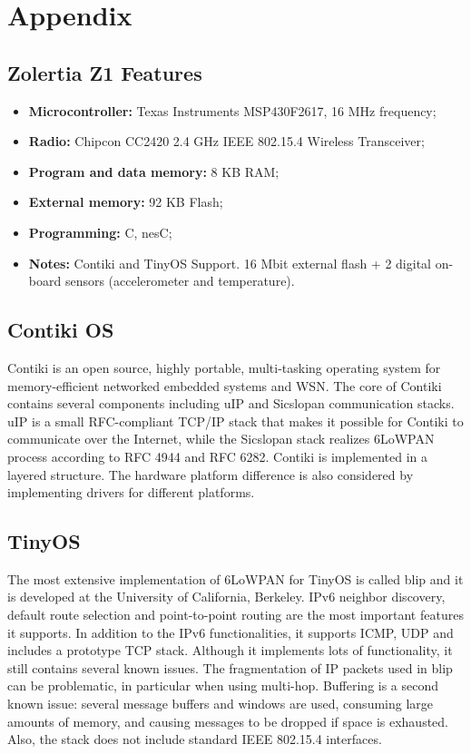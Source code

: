 \documentclass[10pt]{article}
\begin{document}
\section{Appendix}

\subsection{Zolertia Z1 Features}
\label{sec:z1-feats}
\begin{itemize}
  \item \textbf{Microcontroller:} Texas Instruments MSP430F2617, 16 MHz frequency;
  \item \textbf{Radio:} Chipcon CC2420 2.4 GHz IEEE 802.15.4 Wireless Transceiver;
  \item \textbf{Program and data memory:} 8 KB RAM;
  \item \textbf{External memory:} 92 KB Flash;
  \item \textbf{Programming:} C, nesC;
  \item \textbf{Notes:} Contiki and TinyOS Support. 16 Mbit external flash + 2 digital on-board sensors (accelerometer and temperature).
\end{itemize}

\subsection{Contiki OS}
Contiki is an open source, highly portable, multi-tasking operating system for memory-efficient networked embedded systems and WSN.  The core of Contiki contains several components including uIP and Sicslopan communication stacks. uIP is a small RFC-compliant TCP/IP stack that makes it possible for Contiki to communicate over the Internet, while the Sicslopan stack realizes 6LoWPAN process according to RFC 4944 and RFC 6282.  Contiki is implemented in a layered structure.  The hardware platform difference is also considered by implementing drivers for different platforms.  

\subsection{TinyOS}
The most extensive implementation of 6LoWPAN for TinyOS is called blip and it is developed at the University of California, Berkeley.  IPv6 neighbor discovery, default route selection and point-to-point routing are the most important features it supports. In addition to the IPv6 functionalities, it supports ICMP, UDP and includes a prototype TCP stack.  Although it implements lots of functionality, it still contains several known issues.  The fragmentation of IP packets used in blip can be problematic, in particular when using multi-hop.  Buffering is a second known issue: several message buffers and windows are used, consuming large amounts of memory, and causing messages to be dropped if space is exhausted. Also, the stack does not include standard IEEE 802.15.4 interfaces.  
\end{document}
